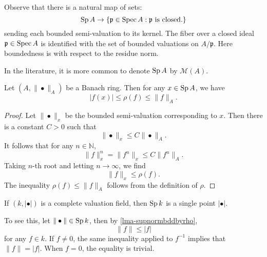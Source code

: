 Observe that there is a natural map of sets:
\begin{equation}\label{eq-SptoSpec}
    \operatorname{Sp} A\rightarrow \left\{\mathfrak{p}\in \operatorname{Spec} A:\mathfrak{p}\text{ is closed.}\right\}
\end{equation}
sending each bounded semi-valuation to its kernel. The fiber over a closed ideal $\mathfrak{p}\in \operatorname{Spec} A$ is identified with the set of bounded valuations on $A/\mathfrak{p}$. Here boundedness is with respect to the residue norm.

\begin{remark}
In the literature, it is more common to denote $\operatorname{Sp} A$ by $\mathcal{M}(A)$. 
\end{remark}

\begin{lemma}\label{lma-supnormbddbyrho}
    Let $(A,\|\bullet\|_A)$ be a Banach ring. Then for any $x\in \operatorname{Sp} A$, we have
    \[
        |f(x)|\leq \rho(f)\leq \|f\|_A.
    \]
\end{lemma}
\begin{proof}
    Let $\|\bullet\|_x$ be the bounded semi-valuation corresponding to $x$. Then there is a constant $C>0$ such that
    \[
        \|\bullet\|_x\leq C\|\bullet\|_A.  
    \]
    It follows that for any $n\in \mathbb{N}$,
    \[
        \|f\|_x^n=\|f^n\|_x\leq C\|f^n\|_A.  
    \]
    Taking $n$-th root and letting $n\to\infty$, we find
    \[
        \|f\|_x\leq \rho(f).    
    \]
    The inequality $\rho(f)\leq \|f\|_A$ follows from the definition of $\rho$.
\end{proof}

\begin{example}\label{ex-valuationfieldspectrum}
    If $(k,|\bullet|)$ is a complete valuation field, then $\operatorname{Sp} k$ is a single point $|\bullet|$.

    To see this, let $\|\bullet\|\in \operatorname{Sp} k$, then by \cref{lma-supnormbddbyrho},
    \[
        \|f\|\leq |f|
    \]
    for any $f\in k$.
    If $f\neq 0$, the same inequality applied to $f^{-1}$ implies that $\|f\|=|f|$. When $f=0$, the equality is trivial. 
\end{example}

